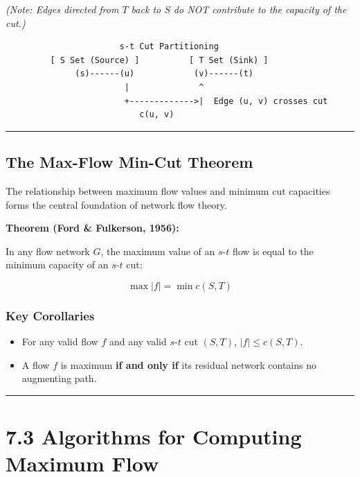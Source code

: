 \documentclass[
]{book}
\providecommand{\tightlist}{%
  \setlength{\itemsep}{0pt}\setlength{\parskip}{0pt}}
\theoremstyle{definition}
\theoremstyle{definition}
\theoremstyle{definition}
\theoremstyle{definition}
\theoremstyle{remark}
\begin{document}
\emph{(Note: Edges directed from \(T\) back to \(S\) do NOT contribute to the capacity of the cut.)}

\begin{verbatim}
                       s-t Cut Partitioning
         [ S Set (Source) ]          [ T Set (Sink) ]
              (s)------(u)            (v)------(t)
                        |              ^
                        +------------->|  Edge (u, v) crosses cut
                           c(u, v)
\end{verbatim}

\begin{center}\rule{0.5\linewidth}{0.5pt}\end{center}

\subsection{The Max-Flow Min-Cut Theorem}\label{the-max-flow-min-cut-theorem}

The relationship between maximum flow values and minimum cut capacities forms the central foundation of network flow theory.

\textbf{Theorem (Ford \& Fulkerson, 1956):}

In any flow network \(G\), the maximum value of an \(s\)-\(t\) flow is equal to the minimum capacity of an \(s\)-\(t\) cut:

\[\max \vert{}f\vert{} = \min c(S, T)\]

\subsubsection{Key Corollaries}\label{key-corollaries}

\begin{itemize}
\tightlist
\item
  For any valid flow \(f\) and any valid \(s\)-\(t\) cut \((S, T)\), \(\vert{}f\vert{} \le c(S, T)\).
\item
  A flow \(f\) is maximum \textbf{if and only if} its residual network contains no augmenting path.
\end{itemize}

\begin{center}\rule{0.5\linewidth}{0.5pt}\end{center}

\section{7.3 Algorithms for Computing Maximum Flow}\label{algorithms-for-computing-maximum-flow}
\end{document}
